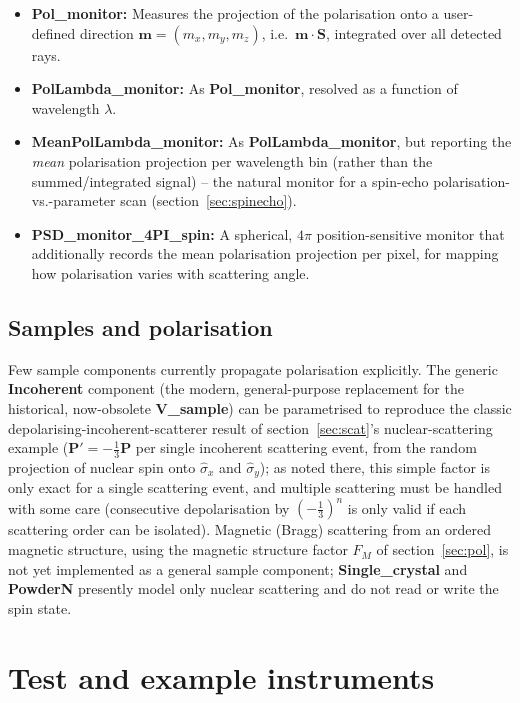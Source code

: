 \begin{itemize}
\item \textbf{Pol\_monitor:} Measures the projection of the polarisation
  onto a user-defined direction $\mathbf{m}=(m_x,m_y,m_z)$, i.e.\
  $\mathbf{m}\cdot\mathbf{S}$, integrated over all detected rays.
\item \textbf{PolLambda\_monitor:} As \textbf{Pol\_monitor}, resolved as a
  function of wavelength $\lambda$.
\item \textbf{MeanPolLambda\_monitor:} As \textbf{PolLambda\_monitor}, but
  reporting the \emph{mean} polarisation projection per wavelength bin
  (rather than the summed/integrated signal) -- the natural monitor for a
  spin-echo polarisation-vs.-parameter scan (section~\ref{sec:spinecho}).
\item \textbf{PSD\_monitor\_4PI\_spin:} A spherical, $4\pi$
  position-sensitive monitor that additionally records the mean
  polarisation projection per pixel, for mapping how polarisation varies
  with scattering angle.
\end{itemize}

\subsection{Samples and polarisation}

Few \MCS sample components currently propagate polarisation explicitly.
The generic \textbf{Incoherent} component (the modern, general-purpose
replacement for the historical, now-obsolete \textbf{V\_sample}) can be
parametrised to reproduce the classic depolarising-incoherent-scatterer
result of section~\ref{sec:scat}'s nuclear-scattering example
($\mathbf{P}' = -\tfrac13\mathbf{P}$ per single incoherent scattering
event, from the random projection of nuclear spin onto $\hat\sigma_x$ and
$\hat\sigma_y$); as noted there, this simple factor is only exact for a
single scattering event, and multiple scattering must be handled with
some care (consecutive depolarisation by $(-\tfrac13)^n$ is only valid if
each scattering order can be isolated). Magnetic (Bragg) scattering from
an ordered magnetic structure, using the magnetic structure factor
$F_M$ of section~\ref{sec:pol}, is not yet implemented as a general sample
component; \textbf{Single\_crystal} and \textbf{PowderN} presently model
only nuclear scattering and do not read or write the spin state.

\section{Test and example instruments}
\label{sec:test}

